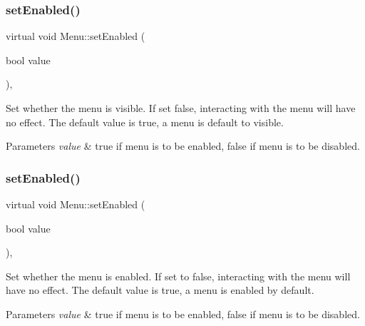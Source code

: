 \subsubsection{\texorpdfstring{set\+Enabled()}{setEnabled()}\hspace{0.1cm}{\footnotesize\ttfamily [1/2]}}
{\footnotesize\ttfamily virtual void Menu\+::set\+Enabled (\begin{DoxyParamCaption}\item[{bool}]{value }\end{DoxyParamCaption})\hspace{0.3cm}{\ttfamily [inline]}, {\ttfamily [virtual]}}

Set whether the menu is visible. If set false, interacting with the menu will have no effect. The default value is true, a menu is default to visible. 
\begin{DoxyParams}{Parameters}
{\em value} & true if menu is to be enabled, false if menu is to be disabled. \\
\hline
\end{DoxyParams}
\mbox{\label{classMenu_a3f1338bc3391dd127892035935b48cdc}} 
\subsubsection{\texorpdfstring{set\+Enabled()}{setEnabled()}\hspace{0.1cm}{\footnotesize\ttfamily [2/2]}}
{\footnotesize\ttfamily virtual void Menu\+::set\+Enabled (\begin{DoxyParamCaption}\item[{bool}]{value }\end{DoxyParamCaption})\hspace{0.3cm}{\ttfamily [inline]}, {\ttfamily [virtual]}}

Set whether the menu is enabled. If set to false, interacting with the menu will have no effect. The default value is true, a menu is enabled by default. 
\begin{DoxyParams}{Parameters}
{\em value} & true if menu is to be enabled, false if menu is to be disabled. \\
\hline
\end{DoxyParams}
\mbox{\label{classMenu_a7dc62dd40fb8b6cd4addee5fb38cb6b9}} 
